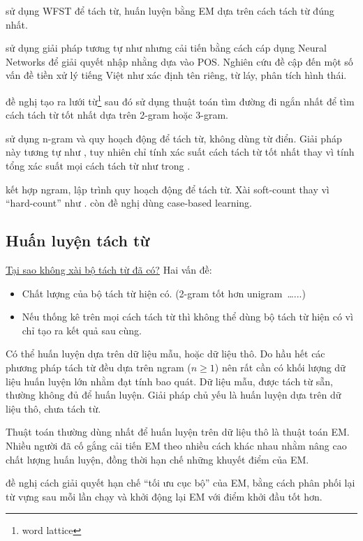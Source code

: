 \documentclass[a4paper,oneside]{book} %
\newcommand{\note}[1]{\underline{#1}}
\theoremstyle{break}
\begin{document}
\cite{Sproat} sử dụng WFST để tách từ, huấn luyện bằng EM dựa trên
cách tách từ đúng nhất.

\cite{wordseg} sử dụng giải pháp tương tự như \cite{Sproat} nhưng cải
tiến bằng cách cáp dụng Neural Networks để giải quyết nhập nhằng dựa
vào POS. Nghiên cứu đề cập đến một số vấn đề tiền xử lý tiếng Việt như
xác định tên riêng, từ láy, phân tích hình thái.

\cite{Ravishankar} đề nghị tạo ra lưới từ\footnote{word lattice} sau
đó sử dụng thuật toán tìm đường đi ngắn nhất để tìm cách tách từ tốt
nhất dựa trên 2-gram hoặc 3-gram.

\cite{LAH} sử dụng n-gram và quy hoạch động để tách từ,
không dùng từ điển. Giải pháp này tương tự như \cite{softcount}, tuy
nhiên chỉ tính xác suất cách tách từ tốt nhất thay vì tính tổng xác
suất mọi cách tách từ như trong \cite{softcount}.

\cite{Chunyu} kết hợp ngram, lập trình quy hoạch động để tách từ. Xài
soft-count thay vì ``hard-count'' như \cite{Chang}. \cite{Chunyu} còn
đề nghị dùng case-based learning.

\subsection{Huấn luyện tách từ}

\note{Tại sao không xài bộ tách từ đã có?} Hai vấn đề:
\begin{itemize}
\item Chất lượng của bộ tách từ hiện có. (2-gram tốt hơn unigram~\ldots...)
\item Nếu thống kê trên mọi cách tách từ thì không thể dùng bộ tách từ
  hiện có vì chỉ tạo ra kết quả sau cùng.
\end{itemize}


Có thể huấn luyện dựa trên dữ liệu mẫu, hoặc dữ liệu thô. Do hầu hết
các phương pháp tách từ đều dựa trên ngram ($n\ge 1$) nên rất cần có
khối lượng dữ liệu huấn luyện lớn nhằm đạt tính bao quát. Dữ liệu
mẫu, được tách từ sẵn, thường không đủ để huấn luyện. Giải pháp chủ
yếu là huấn luyện dựa trên dữ liệu thô, chưa tách từ.

Thuật toán thường dùng nhất để huấn luyện trên dữ liệu thô là thuật
toán EM. Nhiều người đã cố gắng cải tiến EM theo nhiều cách khác nhau
nhằm nâng cao chất lượng huấn luyện, đồng thời hạn chế những khuyết
điểm của EM. 

\cite{self-supervised} đề nghị cách giải quyết hạn chế ``tối ưu cục
bộ'' của EM, bằng cách phân phối lại từ vựng sau mỗi lần chạy và khởi
động lại EM với điểm khởi đầu tốt hơn.
\end{document}
